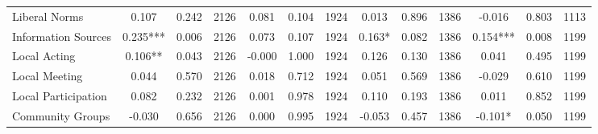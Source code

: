 \begin{tabular}{l*{12}{c}}
 Liberal Norms &        0.107 &        0.242 & 2126    &        0.081 &        0.104 & 1924    &        0.013 &        0.896 & 1386 &       -0.016 &        0.803 & 1113 \\ 

 Information Sources &        0.235*** &        0.006 & 2126    &        0.073 &        0.107 & 1924    &        0.163* &        0.082 & 1386 &        0.154*** &        0.008 & 1199 \\ 

 Local Acting &        0.106** &        0.043 & 2126    &       -0.000 &        1.000 & 1924    &        0.126 &        0.130 & 1386 &        0.041 &        0.495 & 1199 \\ 

 Local Meeting &        0.044 &        0.570 & 2126    &        0.018 &        0.712 & 1924    &        0.051 &        0.569 & 1386 &       -0.029 &        0.610 & 1199 \\ 

 Local Participation &        0.082 &        0.232 & 2126    &        0.001 &        0.978 & 1924    &        0.110 &        0.193 & 1386 &        0.011 &        0.852 & 1199 \\ 

 Community Groups &       -0.030 &        0.656 & 2126    &        0.000 &        0.995 & 1924    &       -0.053 &        0.457 & 1386 &       -0.101* &        0.050 & 1199 \\ 

\hline \end{tabular}
